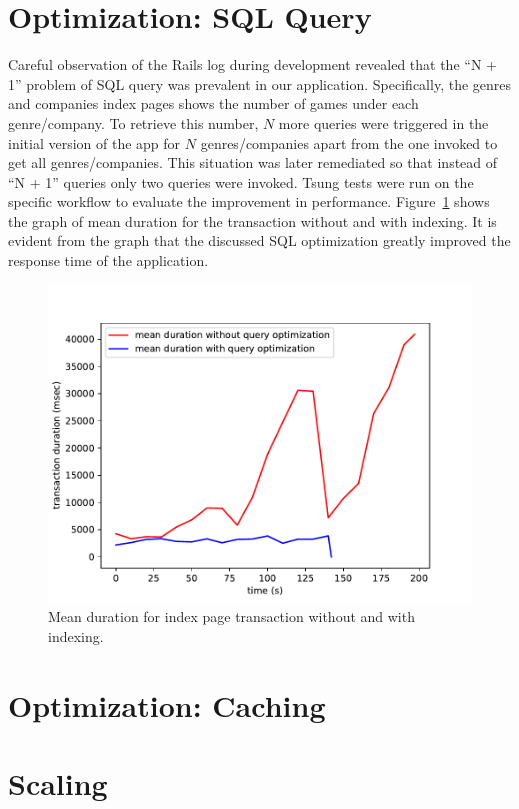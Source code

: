 \section{Optimization: SQL Query}
Careful observation of the Rails log during development revealed that the ``N + 1'' problem of SQL query was prevalent in our application. Specifically, the genres and companies index pages shows the number of games under each genre/company. To retrieve this number, $N$ more queries were triggered in the initial version of the app for $N$ genres/companies apart from the one invoked to get all genres/companies. This situation was later remediated so that instead of ``N + 1'' queries only two queries were invoked. Tsung tests were run on the specific workflow to evaluate the improvement in performance. Figure~\ref{fig:sqlopt} shows the graph of mean duration for the transaction without and with indexing. It is evident from the graph that the discussed SQL optimization greatly improved the response time of the application.
\begin{figure}
	\centering
	\includegraphics{images/list-pages-transaction-duration-without-query-with-query}
	\caption{Mean duration for index page transaction without and with indexing.}\label{fig:sqlopt}
\end{figure}

\section{Optimization: Caching}
\section{Scaling}
